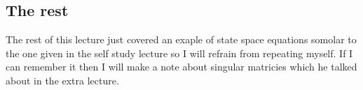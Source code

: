 \documentclass[a4paper,11pt]{article}
\begin{document}
\subsection{The rest}
 The rest of this lecture just covered an exaple of state space equations somolar to the one given in the self study lecture so I will refrain from repeating myself. If I can remember it then I will make a note about singular matricies which he talked about in the extra lecture.                                                                                                                             
\end{document}
